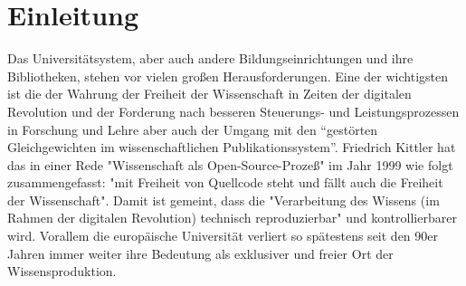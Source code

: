 \chapter{Einleitung} 
Das Universitätsystem, aber auch andere Bildungseinrichtungen und ihre Bibliotheken, stehen vor vielen großen Herausforderungen. Eine der wichtigsten ist die der Wahrung der Freiheit der Wissenschaft in Zeiten der digitalen Revolution und der Forderung nach besseren Steuerungs- und Leistungsprozessen in Forschung und Lehre aber auch der Umgang mit den “gestörten Gleichgewichten im wissenschaftlichen Publikationssystem”\cite{cite:0}. Friedrich Kittler hat das in einer Rede "Wissenschaft als Open-Source-Prozeß" im Jahr 1999 wie folgt zusammengefasst: "mit Freiheit von Quellcode steht und fällt auch die Freiheit der Wissenschaft". Damit ist gemeint, dass die "Verarbeitung des Wissens (im Rahmen der digitalen Revolution) technisch reproduzierbar"\cite{cite:1} und kontrollierbarer wird. Vorallem die europäische Universität verliert so spätestens seit den 90er Jahren immer weiter ihre Bedeutung als exklusiver und freier Ort der Wissensproduktion.

